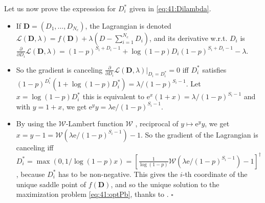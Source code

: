 Let us now prove the expression for $D_i^*$ given in \eqref{eq:41:Dilambda}.
\begin{itemize}
	\item
	If $\boldsymbol{D} = (D_1,\dots,D_{N_c})$,
    the Lagrangian is denoted $\mathcal{L}(\boldsymbol{D}, \lambda) = f(\boldsymbol{D}) + \lambda(D - \sum_{i=1}^{N_c} D_i)$, and its derivative w.r.t. $D_i$ is
    $\frac{\partial}{\partial D_i} \mathcal{L}(\boldsymbol{D}, \lambda) = (1-p)^{S_i + D_i - 1} + \log(1 - p) D_i (1-p)^{S_i + D_i - 1} - \lambda$.

    \item
    So the gradient is canceling $\frac{\partial}{\partial D_i} \mathcal{L}(\boldsymbol{D}, \lambda) |_{D_i=D_i^*} = 0$
    iff $D_i^*$ satisfies $(1-p)^{D_i^*}( 1 + \log(1-p) D_i^*) = \lambda / (1-p)^{S_i - 1}$. Let $x = \log(1-p) D_i^*$ this is equivalent to $\mathrm{e}^{x}(1 + x) = \lambda / (1-p)^{S_i - 1}$
    and with $y = 1 + x$, we get $\mathrm{e}^{y}y = \lambda\mathrm{e} / (1-p)^{S_i - 1}$.

	\item
    By using the $\mathcal{W}$-Lambert function $\mathcal{W}$ \cite{Corless96}, reciprocal of $y \mapsto \mathrm{e}^{y}y$, we get $x = y - 1 = \mathcal{W}(\lambda\mathrm{e} / (1-p)^{S_i - 1}) - 1$.
    So the gradient of the Lagrangian is canceling iff $D_i^* = \max(0, 1/\log(1-p) x) = \left[ \frac{1}{\log(1-p)}\mathcal{W}(\lambda\mathrm{e} / (1-p)^{S_i - 1}) - 1\right]^{\dagger}$, because $D_i^*$ has to be non-negative.
    This gives the $i$-th coordinate of the unique saddle point of $f(\boldsymbol{D})$,
    and so the unique solution to the maximization problem \eqref{eq:41:optPb}, thanks to \cite[Theorem 1]{Luenberger68}.
    \hfill{}$\square$
\end{itemize}

